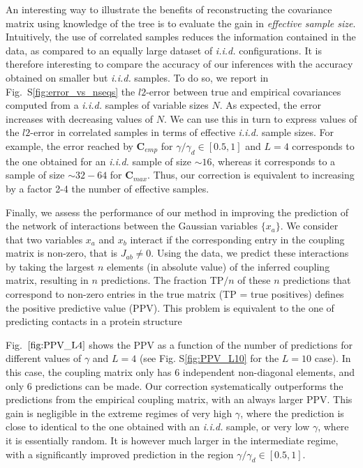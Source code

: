 \documentclass[preprint,amsmath,amssymb,superscriptaddress,showpacs,pre]{revtex4-1}
\newcommand{\sref}[1]{S\ref{#1}}
\begin{document}
An interesting way to illustrate the benefits of reconstructing the covariance matrix using knowledge of the tree is to evaluate the gain in {\em effective sample size}. Intuitively, the use of correlated samples reduces the information contained in the data, as compared to an equally large dataset of \emph{i.i.d.} configurations. It is therefore interesting to compare the accuracy of our inferences with the accuracy obtained on smaller but \emph{i.i.d.} samples. To do so, we report in Fig.~\sref{fig:error_vs_nseqs} the $l2$-error between true and empirical covariances computed from a \emph{i.i.d.} samples of variable sizes $N$. As expected,  the error increases with decreasing values of $N$. 
We can use this in turn to express values of the $l2$-error in correlated samples in terms of effective \emph{i.i.d.} sample sizes.   
For example, the error reached by $\bm{C}_{emp}$ for $\gamma/\gamma_d\in[0.5, 1]$ and $L=4$ corresponds to the one obtained for an \emph{i.i.d.} sample of size $\sim 16$, whereas it corresponds to a sample of size $\sim 32-64$ for $\bm{C}_{max}$.
Thus, our correction is equivalent to increasing by a factor 2-4 the number of effective samples.

Finally, we assess the performance of our method in improving the prediction of the network of interactions between the Gaussian variables $\{x_a\}$. 
We consider that two variables $x_a$ and $x_b$ interact if the corresponding entry in the coupling matrix is non-zero, that is $J_{ab}\neq 0$. 
Using the data, we predict these interactions by taking the largest $n$ elements (in absolute value) of the inferred coupling matrix, resulting in $n$ predictions. 
The fraction TP$/n$ of these $n$ predictions that correspond to non-zero entries in the true matrix (TP = true positives) defines the positive predictive value (PPV). 
This problem is equivalent to the one of predicting contacts in a protein structure 

Fig.~$\ref{fig:PPV_L4}$ shows the PPV as a function of the number of predictions for different values of $\gamma$ and $L=4$ (see Fig. \sref{fig:PPV_L10} for the $L=10$ case). 
In this case, the coupling matrix only has $6$ independent non-diagonal elements, and only 6 predictions can be made. 
Our correction systematically outperforms the predictions from the empirical coupling matrix, with an always larger PPV. 
This gain is negligible in the extreme regimes of very high $\gamma$, where the prediction is close to identical to the one obtained with an \emph{i.i.d.} sample, or very low $\gamma$, where it is essentially random. 
It is however much larger in the intermediate regime, with a significantly improved prediction in the region $\gamma/\gamma_d\in[0.5,1]$.
\end{document}
